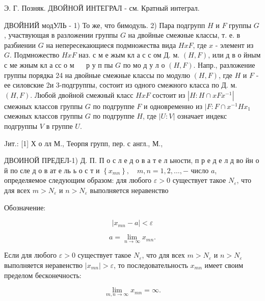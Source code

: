 \documentclass[10pt]{article}
\begin{document}
Э. Г. Позняк. ДВОЙНОЙ ИНТЕГРАЛ - см. Кратный интеграл.



ДВОЙНИЙ модУЛЬ - 1) То же, что бимодуль. 2) Пара подгрупп $H$ и $F$ группы $G$, участвующая в разложении группы $G$ на двойные смежные классы, т. е. в разбиении $G$ на непересекающиеся подмножества вида $H x F$, где $x$ - элемент из $G$. Подмножество $H x F$ наз. с м е жым кл а с с ом Д. м. $(H, F)$, или д в о йным с ме жным кл а сс о м $\quad$ р у п пы $G$ по мо д у л о $(H, F)$. Напр., разложение группы порядка 24 на двойные смежные классы по модулю $(H, F)$, где $H$ и $F$ - ее силовские 2и 3-подгруппы, состоит из одного смежного класса по Д. м. $(H, F)$. Любой двойной смежный класс $H x F$ состоит из $\left|H: H \cap x F x^{-1}\right|$ смежных классов группы $G$ по подгруппе $F$ и одновременно из $\mid F: F \cap x^{-1} H x_{1}$ смежных классов группы $G$ по подгруппе $H$, где $|U: V|$ означает индекс подгруппы $V$ в группе $U$.



Jит.: [1] Х о лл М., Теорпя групп, пер. с англ., М.,



ДВОИНОЙ ПРЕДЕЛ-1) Д. П. П о с л е д о в а т е л ьности, п р е д е л д во йн о й по сле д о в ат е ль ь о с т и $\left\{x_{m n}\right\}, \quad m, n=1,2, \ldots,-$ число $a$, определяемое следующим образом: для любого $\varepsilon>0$ существует такое $N_{\varepsilon}$, что для всех $m>N_{\varepsilon}$ и $n>N_{\varepsilon}$ выполняется неравенство



Обозначение:



\[

\left|x_{m n}-a\right|<\varepsilon

\]



\[

a=\lim _{n \rightarrow \infty} x_{m n} .

\]



Если для любого $\varepsilon>0$ существует такое $N_{\varepsilon}$, что для всех $m>N_{\varepsilon}$ и $n>N_{\varepsilon}$ выполняется неравенство $\left|x_{m n}\right|>\varepsilon$, то последовательность $x_{m n}$ имеет своим пределом бесконечность:



\[

\lim _{m, n \rightarrow \infty} x_{m n}=\infty .

\]
\end{document}
